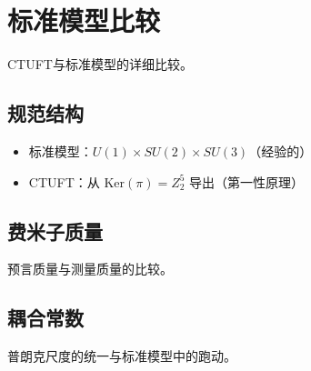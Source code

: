 \section{标准模型比较}
\label{sec:sm_comparison}

CTUFT与标准模型的详细比较。

\subsection{规范结构}

\begin{itemize}
    \item 标准模型：$U(1) \times SU(2) \times SU(3)$（经验的）
    \item CTUFT：从 $\text{Ker}(\pi) = Z_2^5$ 导出（第一性原理）
\end{itemize}

\subsection{费米子质量}

预言质量与测量质量的比较。

\subsection{耦合常数}

普朗克尺度的统一与标准模型中的跑动。
